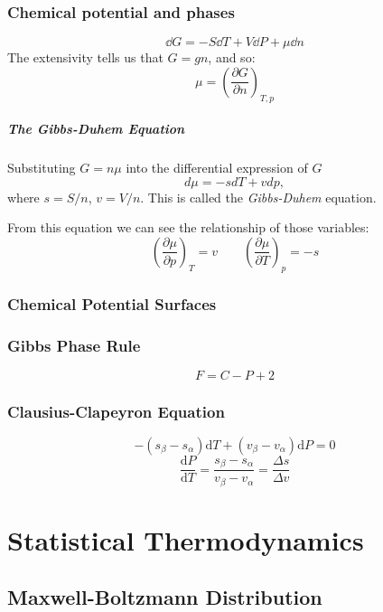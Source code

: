 \documentclass[UTF8]{book}
\begin{document}
\subsection{Chemical potential and phases}
\[
\dd{G}=-S \dd{T} +V \dd{P}+\mu \dd{n}
\]
The extensivity tells us that $G=gn$, and so:
\[
\mu = \left(\frac{\partial G}{\partial n}\right)_{T,p}
\]
\paragraph{The Gibbs-Duhem Equation}
Substituting $G=n\mu$ into the differential expression of $G$
$$d\mu =-sdT+vdp,$$
where $s=S/n$, $v=V/n$. This is called the \emph{Gibbs-Duhem} equation.

 {From this equation we can see the relationship of those variables:}
$$\left(\dfrac{\partial \mu }{\partial p}\right)_T=v \qquad \left(\dfrac{\partial \mu}{\partial T}\right)_p=-s$$
\subsection{Chemical Potential Surfaces}

\subsection{Gibbs Phase Rule}
\[
F = C -P+2
\]
\subsection{Clausius-Clapeyron Equation}
\[
{\displaystyle -(s_{\beta }-s_{\alpha })\mathrm {d} T+(v_{\beta }-v_{\alpha })\mathrm {d} P=0}
\]
\[
{\displaystyle {\frac {\mathrm {d} P}{\mathrm {d} T}}={\frac {s_{\beta }-s_{\alpha }}{v_{\beta }-v_{\alpha }}}={\frac {\Delta s}{\Delta v}}}
\]

\chapter{Statistical Thermodynamics}
\section{Maxwell-Boltzmann Distribution}
\end{document}
